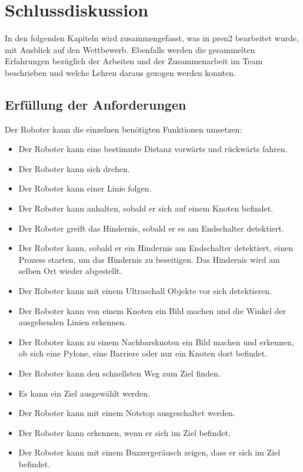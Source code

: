 \section{Schlussdiskussion}

In den folgenden Kapiteln wird zusammengefasst, was in \acrshort{pren2} bearbeitet wurde, mit Ausblick auf den Wettbewerb.
Ebenfalls werden die gesammelten Erfahrungen bezüglich der Arbeiten und der Zusammenarbeit im Team beschrieben und welche Lehren daraus gezogen werden konnten.

\subsection{Erfüllung der Anforderungen}

Der Roboter kann die einzelnen benötigten Funktionen umsetzen:

\begin{itemize}
    \item Der Roboter kann eine bestimmte Distanz vorwärts und rückwärts fahren.
    \item Der Roboter kann sich drehen.
    \item Der Roboter kann einer Linie folgen.
    \item Der Roboter kann anhalten, sobald er sich auf einem Knoten befindet.
    \item Der Roboter greift das Hindernis, sobald er es am Endschalter detektiert.
    \item Der Roboter kann, sobald er ein Hindernis am Endschalter detektiert, einen Prozess starten, um das Hindernis zu beseitigen. Das Hindernis wird am selben Ort wieder abgestellt.
    \item Der Roboter kann mit einem Ultraschall Objekte vor sich detektieren.
    \item Der Roboter kann von einem Knoten ein Bild machen und die Winkel der ausgehenden Linien erkennen.
    \item Der Roboter kann zu einem Nachbarsknoten ein Bild machen und erkennen, ob sich eine Pylone, eine Barriere oder nur ein Knoten dort befindet.
    \item Der Roboter kann den schnellsten Weg zum Ziel finden.
    \item Es kann ein Ziel ausgewählt werden.
    \item Der Roboter kann mit einem Notstop ausgeschaltet werden.
    \item Der Roboter kann erkennen, wenn er sich im Ziel befindet.
    \item Der Roboter kann mit einem Buzzergeräusch zeigen, dass er sich im Ziel befindet.
\end{itemize}

